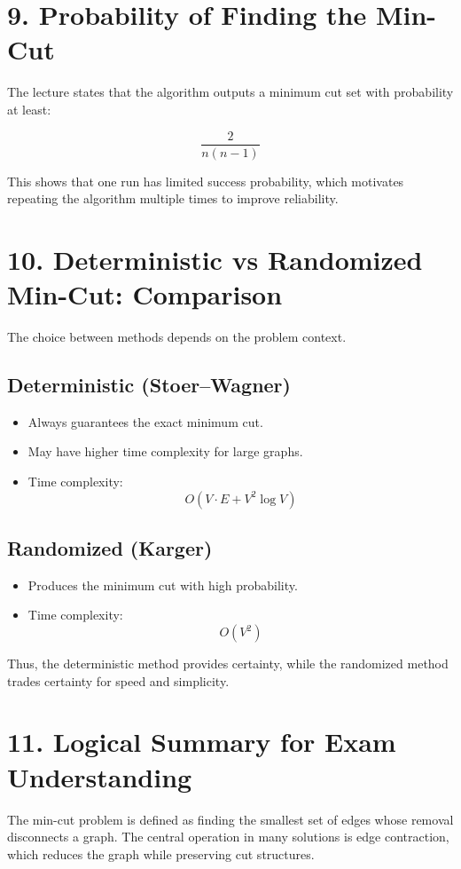 \documentclass[12pt]{article}
\begin{document}
\section*{9. Probability of Finding the Min-Cut}

The lecture states that the algorithm outputs a minimum cut set with probability at least:

\[
\frac{2}{n(n-1)}
\]

This shows that one run has limited success probability, which motivates repeating the algorithm multiple times to improve reliability.

\section*{10. Deterministic vs Randomized Min-Cut: Comparison}

The choice between methods depends on the problem context.

\subsection*{Deterministic (Stoer–Wagner)}
\begin{itemize}
\item Always guarantees the exact minimum cut.
\item May have higher time complexity for large graphs.
\item Time complexity:
\[
O(V \cdot E + V^2 \log V)
\]
\end{itemize}

\subsection*{Randomized (Karger)}
\begin{itemize}
\item Produces the minimum cut with high probability.
\item Time complexity:
\[
O(V^2)
\]
\end{itemize}

Thus, the deterministic method provides certainty, while the randomized method trades certainty for speed and simplicity.

\section*{11. Logical Summary for Exam Understanding}

The min-cut problem is defined as finding the smallest set of edges whose removal disconnects a graph. The central operation in many solutions is edge contraction, which reduces the graph while preserving cut structures.
\end{document}
